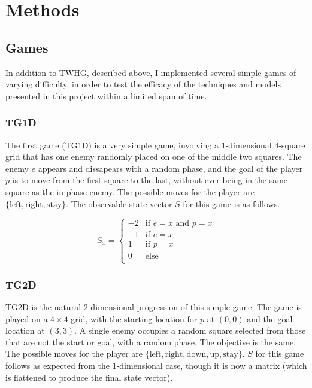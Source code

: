 \documentclass[12pt]{article}
\begin{document}
\section{Methods}

\subsection{Games}

In addition to TWHG, described above, I implemented several simple games of varying difficulty, in order to test the efficacy of the techniques and models presented in this project within a limited span of time.

\subsubsection{TG1D}

The first game (TG1D) is a very simple game, involving a 1-dimensional 4-square grid that has one enemy randomly placed on one of the middle two squares. The enemy $e$ appears and dissapears with a random phase, and the goal of the player $p$ is to move from the first square to the last, without ever being in the same square as the in-phase enemy. The possible moves for the player are $\{\text{left}, \text{right}, \text{stay}\}$. The observable state vector $S$ for this game is as follows.

\[S_{x} =
\begin{cases}
  -2 & \text{if } e = x \text{ and } p = x \\
  -1 & \text{if } e = x \\
  1 & \text{if }  p = x \\
  0 & \text{else} \\
\end{cases}
\]

\subsubsection{TG2D}

TG2D is the natural 2-dimensional progression of this simple game. The game is played on a $4 \times 4$ grid, with the starting location for $p$ at $(0, 0)$ and the goal location at $(3, 3)$. A single enemy occupies a random square selected from those that are not the start or goal, with a random phase. The objective is the same.  The possible moves for the player are $\{\text{left}, \text{right}, \text{down}, \text{up}, \text{stay}\}$. $S$ for this game follows as expected from the 1-dimensional case, though it is now a matrix (which is flattened to produce the final state vector).
\end{document}

